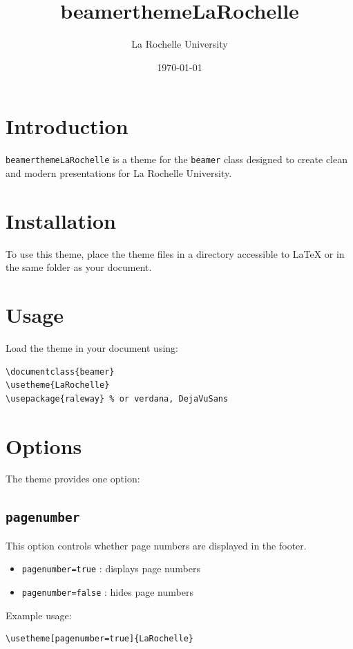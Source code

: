 \documentclass{article}
\title{beamerthemeLaRochelle}
\author{La Rochelle University}
\date{\today}
\begin{document}
\maketitle

\section{Introduction}

\texttt{beamerthemeLaRochelle} is a theme for the \texttt{beamer} class designed to create clean and modern presentations for La Rochelle University.

\section{Installation}

To use this theme, place the theme files in a directory accessible to \LaTeX{} or in the same folder as your document.

\section{Usage}

Load the theme in your document using:

\begin{verbatim}
\documentclass{beamer}
\usetheme{LaRochelle}
\usepackage{raleway} % or verdana, DejaVuSans
\end{verbatim}

\section{Options}

The theme provides one option:

\subsection{\texttt{pagenumber}}

This option controls whether page numbers are displayed in the footer.

\begin{itemize}
  \item \texttt{pagenumber=true} : displays page numbers
  \item \texttt{pagenumber=false} : hides page numbers
\end{itemize}

Example usage:

\begin{verbatim}
\usetheme[pagenumber=true]{LaRochelle}
\end{verbatim}
\end{document}
